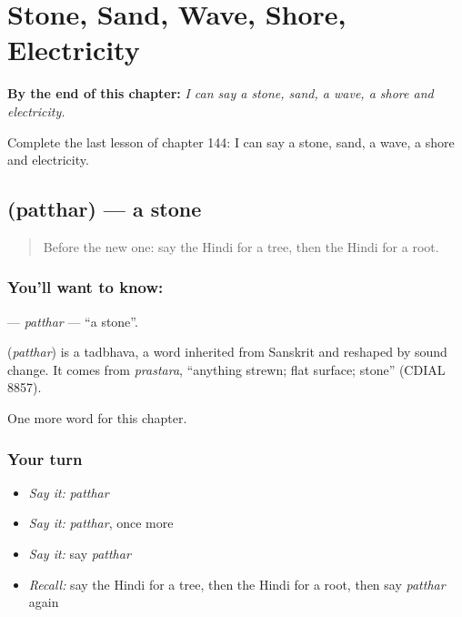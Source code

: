 
\chapter{Stone, Sand, Wave, Shore, Electricity}
\label{ch:hi-stone-sand-wave-shore-electricity}

\begin{chapteropening}
\textbf{By the end of this chapter:} \emph{I can say a stone, sand, a wave, a shore and electricity.}

Complete the last lesson of chapter 144: I can say a stone, sand, a wave, a shore and electricity.
\end{chapteropening}

\section[\texorpdfstring{\hi{पत्थर} (patthar)}{पत्थर (patthar)}]{ (patthar) — a stone}

\label{lesson:HI-C144-patthar}



\begin{quote}
Before the new one: say the Hindi for a tree, then the Hindi for a root.
\end{quote}

\subsection*{You'll want to know: }
\textbf{} — \emph{patthar} — \textquotedblleft{}a stone\textquotedblright{}.

\begin{cousinweb}
\textbf{} (\emph{patthar}) is a tadbhava, a word inherited from Sanskrit and reshaped by sound change. It comes from \emph{prastara}, \textquotedblleft{}anything strewn; flat surface; stone\textquotedblright{} (CDIAL 8857).
\end{cousinweb}

\begin{grammarlens}[title={What you've built}]
One more word for this chapter.
\end{grammarlens}

\subsection*{Your turn}
\begin{itemize}
\raggedright
  \item \emph{Say it:} \emph{patthar}
  \item \emph{Say it:} \emph{patthar}, once more
  \item \emph{Say it:} say \emph{patthar}
  \item \emph{Recall:} say the Hindi for a tree, then the Hindi for a root, then say \emph{patthar} again
\end{itemize}

